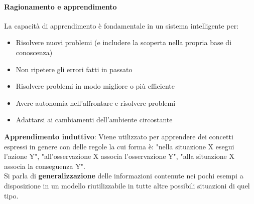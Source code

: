 \documentclass[../main.tex]{subfiles}
\begin{document}
	\paragraph{Ragionamento e apprendimento}
	La capacità di apprendimento è fondamentale in un sistema intelligente per:
	\begin{itemize}
		\item Risolvere nuovi problemi (e includere la scoperta nella propria base di conoscenza)
		\item Non ripetere gli errori fatti in passato
		\item Risolvere problemi in modo migliore o più efficiente
		\item Avere autonomia nell'affrontare e risolvere problemi
		\item Adattarsi ai cambiamenti dell'ambiente circostante
	\end{itemize}
	\textbf{Apprendimento induttivo}: Viene utilizzato per apprendere dei concetti espressi in genere con delle regole la cui forma è: "nella situazione X esegui l'azione Y", "all'osservazione X associa l'osservazione Y", "alla situazione X associa la conseguenza Y".\\
	Si parla di \textbf{generalizzazione} delle informazioni contenute nei pochi esempi a disposizione in un modello riutilizzabile in tutte altre possibili situazioni di quel tipo.
\end{document}
